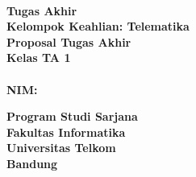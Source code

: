 {\centering
\large
{\bigsize\bf \Title}\\
\vspace{ 2cm}
\rm
\iflogTA
\textbf{Tugas Akhir}\\
\vspace{0.5 cm}
\textbf{Kelompok Keahlian: Telematika\KK}\\
\else
\textbf{Proposal Tugas Akhir}\\
\vspace{0.5 cm}
\textbf{Kelas TA 1}\\
\fi
\vspace{0.5 cm}
\textbf{\Author}\\ \textbf{NIM: \NIM}\\ 

\vspace{1.5 cm}

\begin{figure}[h]
{\par}
\end{figure}

\vspace{2 cm}
{\bigsize\textbf{Program Studi Sarjana \Prodi}\\
\vspace{0.5 cm}
\textbf{Fakultas Informatika}\\
\vspace{0.5 cm}
\textbf{Universitas Telkom}\\
\vspace{0.5 cm}
\textbf{Bandung}\\
\vspace{0.5 cm}
\textbf{\Date}\\}
}